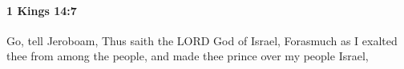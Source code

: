 
		\paragraph{1 Kings 14:7} %
			\label{1KINGS-14-7}

			Go, tell Jeroboam, Thus saith the LORD God of Israel, Forasmuch as I exalted thee from among the people, and made thee prince over my people Israel,


